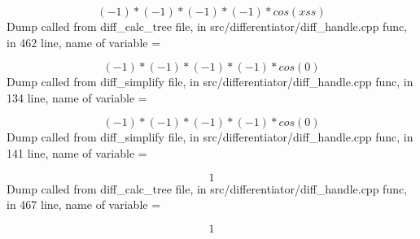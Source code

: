 \documentclass{article}
\begin{document}
$$
(-1) * (-1) * (-1) * (-1) *  cos (xss)
$$
Dump called from diff_calc_tree file, in src/differentiator/diff_handle.cpp func, in 462 line, name of variable = 


$$
(-1) * (-1) * (-1) * (-1) *  cos (0)
$$
Dump called from diff_simplify file, in src/differentiator/diff_handle.cpp func, in 134 line, name of variable = 


$$
(-1) * (-1) * (-1) * (-1) *  cos (0)
$$
Dump called from diff_simplify file, in src/differentiator/diff_handle.cpp func, in 141 line, name of variable = 


$$
1
$$
Dump called from diff_calc_tree file, in src/differentiator/diff_handle.cpp func, in 467 line, name of variable = 


$$
1
$$
\end{document}
